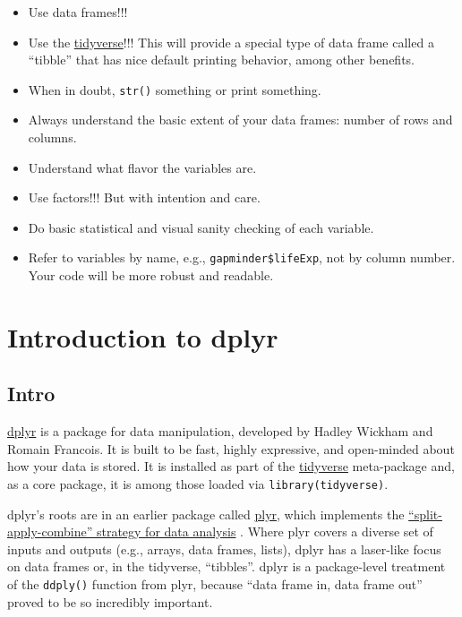 \documentclass[
]{book}
\begin{document}
\begin{itemize}
\item
  Use data frames!!!
\item
  Use the \href{https://tidyverse.tidyverse.org}{tidyverse}!!! This will provide a special type of data frame called a ``tibble'' that has nice default printing behavior, among other benefits.
\item
  When in doubt, \texttt{str()} something or print something.
\item
  Always understand the basic extent of your data frames: number of rows and columns.
\item
  Understand what flavor the variables are.
\item
  Use factors!!! But with intention and care.
\item
  Do basic statistical and visual sanity checking of each variable.
\item
  Refer to variables by name, e.g., \texttt{gapminder\$lifeExp}, not by column number. Your code will be more robust and readable.
\end{itemize}

\hypertarget{dplyr-intro}{%
\chapter{Introduction to dplyr}\label{dplyr-intro}}

\hypertarget{intro}{%
\section{Intro}\label{intro}}

\href{https://dplyr.tidyverse.org}{dplyr} is a package for data manipulation, developed by Hadley Wickham and Romain Francois. It is built to be fast, highly expressive, and open-minded about how your data is stored. It is installed as part of the \href{https://tidyverse.tidyverse.org}{tidyverse} meta-package and, as a core package, it is among those loaded via \texttt{library(tidyverse)}.

dplyr's roots are in an earlier package called \href{http://plyr.had.co.nz}{plyr}, which implements the \href{https://www.jstatsoft.org/article/view/v040i01}{``split-apply-combine'' strategy for data analysis} \citep{wickham2011a}. Where plyr covers a diverse set of inputs and outputs (e.g., arrays, data frames, lists), dplyr has a laser-like focus on data frames or, in the tidyverse, ``tibbles''. dplyr is a package-level treatment of the \texttt{ddply()} function from plyr, because ``data frame in, data frame out'' proved to be so incredibly important.
\end{document}
